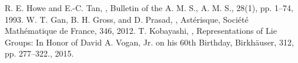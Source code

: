 \documentclass[11pt,a4paper,twoside]{jarticle}
\newcommand{\研究課題名}{Symmetry breaking operators}
\newcommand{\研究機関名}{東京大学}
\newcommand{\申請者氏名}{レオンチエフ\,オレクシィ}
\newcommand{\研究代表者氏名}{\申請者氏名}
\newcommand{\研究期間の最終元号年度}{31}	%
\begin{document}
{	\begin{thebibliography}{99}
	 R. E. Howe and E.-C. Tan, ,
	Bulletin of the A. M. S., A. M. S., 28(1), pp. 1--74, 1993.
  W. T. Gan, B. H. Gross, and D. Prasad, , Ast\'erisque, {Soci{\'e}t{\'e} Math{\'e}matique de France}, 346, 2012.
		T. Kobayashi,
		, Representations of Lie Groups: In Honor of David A. Vogan, Jr. on his 60th Birthday,
		 Birkh\"auser, 312, pp. 277--322., 2015.
	\end{thebibliography}
}
\end{document}
